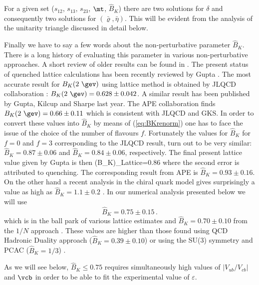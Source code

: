For a given set ($s_{12}$, $s_{13}$, $s_{23}$,
$\mt$, $\hat B_K$) there are two solutions for $\delta$ and consequently two
solutions for $(\bar\varrho,\bar\eta)$. 
This will be evident from the analysis of the unitarity triangle discussed
in detail below.

Finally we have to say a few words about the non-perturbative
parameter $\hat B_K$. There is a long history of evaluating  this parameter
in various non-perturbative approaches. A short review of older results
can be found in \cite{BF97}.
The present status of quenched lattice calculations has been recently
reviewed by Gupta \cite{GUPTA98}.
The most accurate result for $B_K(2~\gev)$
using lattice method is obtained by JLQCD collaboration  \cite{JLQCD}:
$B_K(2~\gev)=0.628\pm0.042$. 
A similar result has been published by Gupta, Kilcup and
Sharpe \cite{GKS} last year.
The APE collaboration \cite{APE} 
finds $B_K(2~\gev)=0.66\pm0.11$ which is
consistent with JLQCD and GKS. In order to convert these values into
$\hat B_K$ by means of (\ref{eq:BKrenorm}) one has to face the issue
of the choice of the number of flavours $f$. Fortunately the values for
$\hat B_K$ for $f=0$ and $f=3$ corresponding to the JLQCD result,
turn out to be very similar: $\hat B_K=0.87\pm0.06$ and
$\hat B_K=0.84\pm0.06$, respectively. The final present lattice value
given by Gupta is then
\be
(\hat B_K)_{\rm Lattice}=0.86
\ee
where the second error is attributed to quenching. The
corresponding result from APE  is $\hat B_K=0.93\pm0.16$.
On the other hand a recent analysis in
the chiral quark model gives surprisingly a value as high as 
$\hat B_K=1.1\pm 0.2$ \cite{BERT97}. In our numerical analysis presented 
below we will use 
\begin{equation}\label{BKT}
\hat B_K=0.75\pm 0.15 \,.
\end{equation}
which is in the ball park of various lattice estimates and
$\hat B_K=0.70\pm 0.10$ from
the $1/N$ approach \cite{BBG0,Bijnens}.
These values are higher than those found using QCD Hadronic Duality
approach   ($\hat B_K=0.39\pm0.10$) \cite{Prades} 
or using the SU(3) symmetry and
PCAC ($\hat B_K=1/3$) \cite{Donoghue}.
  
As we will see below, $\hat B_K\le 0.75 $ requires simultaneously high
values of $|V_{ub}/V_{cb}|$ and $\vcb$ in order to be able to fit
the experimental value of $\varepsilon$.


